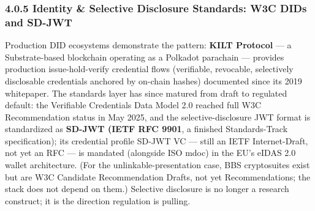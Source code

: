 \documentclass[
]{article}
\begin{document}
\subsubsection{4.0.5 Identity \& Selective Disclosure Standards: W3C
DIDs and
SD-JWT}\label{identity-selective-disclosure-standards-w3c-dids-and-sd-jwt}

Production DID ecosystems demonstrate the pattern: \textbf{KILT
Protocol} --- a Substrate-based blockchain operating as a Polkadot
parachain --- provides production issue-hold-verify credential flows
(verifiable, revocable, selectively disclosable credentials anchored by
on-chain hashes) documented since its 2019 whitepaper. The standards
layer has since matured from draft to regulated default: the Verifiable
Credentials Data Model 2.0 reached full W3C Recommendation status in May
2025, and the selective-disclosure JWT format is standardized as
\textbf{SD-JWT (IETF RFC 9901}, a finished Standards-Track
specification); its credential profile SD-JWT VC --- still an IETF
Internet-Draft, not yet an RFC --- is mandated (alongside ISO mdoc) in
the EU's eIDAS 2.0 wallet architecture. (For the unlinkable-presentation
case, BBS cryptosuites exist but are W3C Candidate Recommendation
Drafts, not yet Recommendations; the stack does not depend on them.)
Selective disclosure is no longer a research construct; it is the
direction regulation is pulling.
\end{document}
